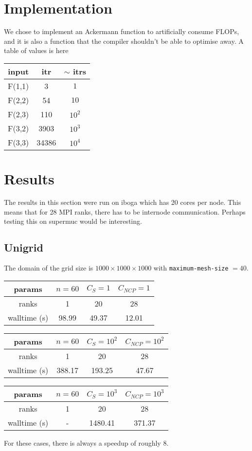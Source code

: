 \documentclass{article}
\begin{document}
\section{Implementation}
We chose to implement an Ackermann function to artificially consume
FLOPs, and it is also a function that the compiler shouldn't be able to
optimise away. A table of values is here 
\begin{center}
\begin{tabular}{c|c|c}
input & itr  & $\sim$ itrs\\ 
\hline
F(1,1)& 3 & $1$\\
F(2,2)& 54 & $10$\\
F(2,3)& 110 & $10^{2}$\\
F(3,2)& 3903 & $10^{3}$\\
F(3,3) & 34386 & $10^{4}$
\end{tabular}
\end{center}

\section{Results}
The results in this section were run on iboga which has 20 cores per
node. This means that for 28 MPI ranks, there has to be internode
communication. Perhaps testing this on supermuc would be interesting.

\subsection{Unigrid}

The domain of the grid size is $1000\times1000\times1000$ with 
\texttt{maximum-mesh-size} $=40$.

\begin{center}
\begin{tabular}{c|c|c|c}
params & $n=60$ & $C_{S} = 1$ & $C_{NCP} = 1$\\
\hline
ranks & 1 & 20 & 28\\
\hline
walltime (s) & 98.99 & 49.37 & 12.01
\end{tabular}
\end{center}

\begin{center}
\begin{tabular}{c|c|c|c}
params & $n=60$ & $C_{S} = 10^{2}$ & $C_{NCP} = 10^{2}$\\
\hline
ranks & 1 & 20 & 28\\
\hline
walltime (s) & 388.17 & 193.25 & 47.67
\end{tabular}
\end{center}

\begin{center}
\begin{tabular}{c|c|c|c}
params & $n=60$ & $C_{S} = 10^{3}$ & $C_{NCP} = 10^{3}$\\
\hline
ranks & 1 & 20 & 28\\
\hline
walltime (s) & - & 1480.41 & 371.37
\end{tabular}
\end{center}

For these cases, there is always a speedup of roughly 8.
\end{document}
